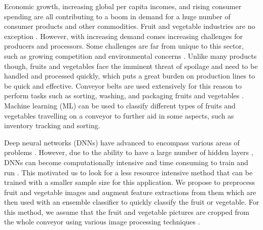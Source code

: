 Economic growth, increasing global per capita incomes, and rising consumer spending are all contributing to a boom in demand for a huge number of consumer products and other commodities. Fruit and vegetable industries are no exception \cite{b1_1}. However, with increasing demand comes increasing challenges for producers and processors. Some challenges are far from unique to this sector, such as growing competition \cite{b1_2} and environmental concerns \cite{b1_3}. Unlike many products though, fruits and vegetables face the imminent threat of spoilage and need to be handled and processed quickly, which puts a great burden on production lines to be quick and effective. Conveyor belts are used extensively for this reason to perform tasks such as sorting, washing, and packaging fruits and vegetables \cite{b1_4}. Machine learning (ML) can be used to classify different types of fruits and vegetables travelling on a conveyor to further aid in some aspects, such as inventory tracking and sorting.

Deep neural networks (DNNs) have advanced to encompass various areas of problems \cite{b1_5,b1_6}. However, due to the ability to have a large number of hidden layers \cite{b1_7}, DNNs can become computationally intensive and time consuming to train and run \cite{b1_8}. This motivated us to look for a less resource intensive method that can be trained with a smaller sample size for this application. We propose to preprocess fruit and vegetable images and augment feature extractions from them which are then used with an ensemble classifier to quickly classify the fruit or vegetable. For this method, we assume that the fruit and vegetable pictures are cropped from the whole conveyor using various image processing techniques \cite{b1_9}.